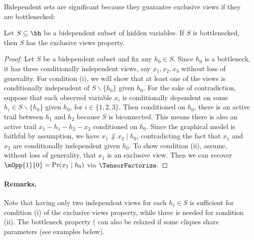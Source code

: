Bidependent sets are significant because they guarantee exclusive views if they
are bottlenecked:
\begin{lemma}
  \label{lem:bottleneck-views}  
  Let $S \subseteq \bh$ be a bidependent subset of hidden variables.
  If $S$ is bottlenecked, then $S$ has the exclusive views property.
\end{lemma}
\begin{proof}
Let $S$ be a bidependent subset and fix any $h_0 \in S$.
Since $h_0$ is a bottleneck, it has three conditionally independent views,
say $x_1, x_2, x_3$ without loss of generality. 
For condition (i), we will show that at least one of the views is conditionally independent
of $S \backslash \{ h_0 \}$ given $h_0$.
For the sake of contradiction, 
suppose that each observed variable $x_i$ is conditionally dependent on some
$h_i \in S \backslash \{h_0\}$ given $h_0$, for $i \in \{1, 2, 3\}$.
Then conditioned on $h_0$,
there is an active trail between $h_1$ and $h_2$ because $S$ is biconnected.
This means there is also an active trail $x_1 - h_1 - h_2 - x_2$ conditioned on $h_0$.
Since the graphical model is faithful by assumption, we have $x_1 \not\perp x_2 \mid h_0$,
contradicting the fact that $x_1$ and $x_2$ are conditionally independent given $h_0$.
To show condition (ii), assume, without loss of generality, that $x_1$ is an exclusive view.
Then we can recover $\mOpp{1}{0} = \Pr(x_1 \mid h_0)$ via $\TensorFactorize$.
\end{proof}


\paragraph{Remarks.}
Note that having only two independent views for each $h_i \in S$ is sufficient for condition (i)
  of the exclusive views property, while three is needed for condition (ii).
The bottleneck property ( can also be relaxed if some cliques
  share parameters (see examples below).

